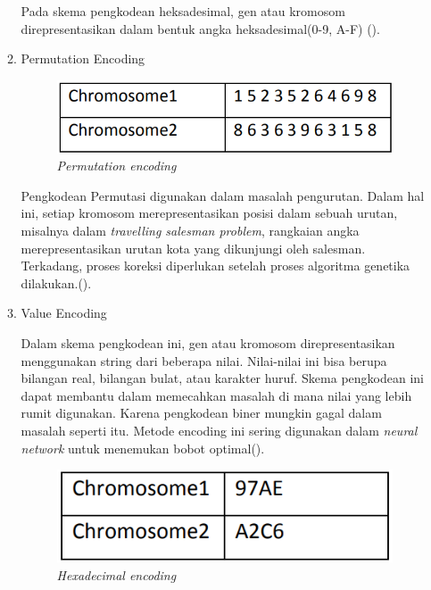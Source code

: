 \begin{enumerate}
\begin{enumerate}
    Pada skema pengkodean heksadesimal, gen atau kromosom direpresentasikan dalam bentuk angka heksadesimal(0-9, A-F) (\cite{kumar2013encoding}).
    \item Permutation Encoding
      \begin{figure} [ht] \centering
          \includegraphics[scale=0.6]{gambar/permutation.png}
          \caption{\emph{Permutation encoding}}
          \label{fig:permutation}
        \end{figure}

        Pengkodean Permutasi digunakan dalam masalah pengurutan. 
        Dalam hal ini, setiap kromosom merepresentasikan posisi dalam sebuah urutan, misalnya dalam \emph{travelling salesman problem}, rangkaian angka merepresentasikan urutan kota yang dikunjungi oleh salesman.
        Terkadang, proses koreksi diperlukan setelah proses algoritma genetika dilakukan.(\cite{kumar2013encoding}). 
    \item Value Encoding

    Dalam skema pengkodean ini, gen atau kromosom direpresentasikan menggunakan string dari beberapa nilai. 
    Nilai-nilai ini bisa berupa bilangan real, bilangan bulat, atau karakter huruf. 
    Skema pengkodean ini dapat membantu dalam memecahkan masalah di mana nilai yang lebih rumit digunakan. 
    Karena pengkodean biner mungkin gagal dalam masalah seperti itu. 
    Metode encoding ini sering digunakan dalam \emph{neural network} untuk menemukan bobot optimal(\cite{Katoch2020}).
    \begin{figure} [!h] \centering
      \includegraphics[scale=0.6]{gambar/hexa.png}
      \caption{\emph{Hexadecimal encoding}}
      \label{fig:hexa}
    \end{figure}
  \end{enumerate}
  

\end{enumerate}
